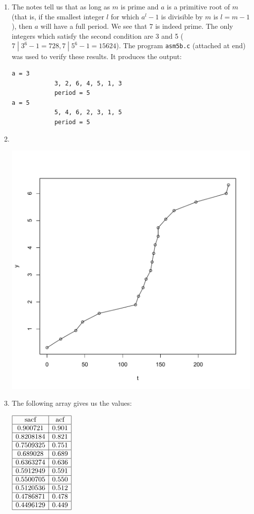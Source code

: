 \documentclass[11pt]{article} %
\newcommand{\tr}{\textrm}
\begin{document}
\begin{enumerate}
\item The notes tell us that as long as $m$ is prime and $a$ is a primitive root of $m$ (that is, if the smallest integer $l$ for which $a^l - 1$ is divisible by $m$ is $l  = m - 1$), then $a$ will have a full period.  We see that 7 is indeed prime.  The only integers which satisfy the second condition are 3 and 5 ($7\;|\;3^6 - 1 = 728, 7\;|\;5^6 - 1 = 15624$).  The program \texttt{asm5b.c} (attached at end) was used to verify these results.  It produces the output:
\begin{verbatim}a = 3
        	3, 2, 6, 4, 5, 1, 3
        	period = 5
a = 5
        	5, 4, 6, 2, 3, 1, 5
        	period = 5\end{verbatim}

\item $ $

\includegraphics[scale = .5]{plot1.pdf}

\item The following array gives us the values:

$\begin{array}{|c|c|}\hline
\tr{sacf} & \tr{acf}\\\hline
0.900721 & 0.901\\\hline
0.8208184 & 0.821\\\hline
0.7509325 & 0.751\\\hline
0.689028 & 0.689\\\hline
0.6363274 & 0.636\\\hline
0.5912949 & 0.591\\\hline
0.5500705 & 0.550\\\hline
0.5120536 & 0.512\\\hline
0.4786871 & 0.478\\\hline
0.4496129 & 0.449\\\hline
\end{array}$


\end{enumerate}
\end{document}
